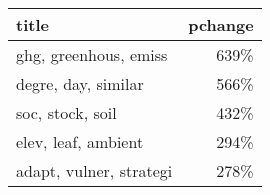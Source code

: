 \begin{tabular}{lr}
\toprule
                   title &  pchange \\
\midrule
   ghg, greenhous, emiss &     639\% \\
     degre, day, similar &     566\% \\
        soc, stock, soil &     432\% \\
     elev, leaf, ambient &     294\% \\
 adapt, vulner, strategi &     278\% \\
\bottomrule
\end{tabular}
